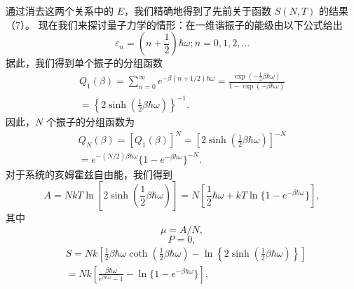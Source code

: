 通过消去这两个关系中的 \(E\)，我们精确地得到了先前关于函数 \(S(N,T)\) 的结果（7）。
现在我们来探讨量子力学的情形：在一维谐振子的能级由以下公式给出
\begin{equation}\tag{3.5.65}\label{eq:3.5.65}
\varepsilon _ { n } = \left( n + \frac { 1 } { 2 } \right) \hbar \omega ;  n = 0 , 1 , 2 , \ldots
\end{equation}
据此，我们得到单个振子的分组函数
\begin{equation}\tag{3.5.66}\label{eq:3.5.66}
\begin{array}{r} { Q _ { 1 } ( \beta ) = \displaystyle \sum _ { n = 0 } ^{\infty} e ^{- \beta ( n + 1 / 2 ) \hbar \omega} = \displaystyle \frac { \exp \left( - \frac { 1 } { 2 } \beta \hbar \omega \right) } { 1 - \exp ( - \beta \hbar \omega ) } } \\{ = \left\{ 2 \sinh \left( \frac { 1 } { 2 } \beta \hbar \omega \right) \right\} ^{- 1} . } \end{array}
\end{equation}
因此，\(N\) 个振子的分组函数为
\begin{equation}\tag{3.5.67}\label{eq:3.5.67}
\begin{array}{r} { Q _ { N } ( \beta ) = [ Q _ { 1 } ( \beta ) ] ^{N} = \left[ 2 \sinh \left( \frac { 1 } { 2 } \beta \hbar \omega \right) \right] ^{- N} } \\{ = e ^{- ( N / 2 ) \beta \hbar \omega} \{ 1 - e ^{- \beta \hbar \omega} \} ^{- N} . } \end{array}
\end{equation}
对于系统的亥姆霍兹自由能，我们得到
\begin{equation}\tag{3.5.68}\label{eq:3.5.68}
A = N k T \ln \left[ 2 \sinh \left( \frac { 1 } { 2 } \beta \hbar \omega \right) \right] = N \left[ \frac { 1 } { 2 } \hbar \omega + k T \ln \{ 1 - e ^{- \beta \hbar \omega} \} \right] ,
\end{equation}
其中
\begin{equation}\tag{3.5.69}\label{eq:3.5.69}
\mu = A / N ,
\end{equation}
\begin{equation}\tag{3.5.70}\label{eq:3.5.70}
P = 0 ,
\end{equation}
\begin{equation}\tag{3.5.71}\label{eq:3.5.71}
\begin{array}{rl} & { S = N k \left[ \frac { 1 } { 2 } \beta \hbar \omega \coth \left( \frac { 1 } { 2 } \beta \hbar \omega \right) - \ln \left\{ 2 \sinh \left( \frac { 1 } { 2 } \beta \hbar \omega \right) \right\} \right] } \\& { = N k \left[ \frac { \beta \hbar \omega } { e ^{\beta \hbar \omega} - 1 } - \ln \{ 1 - e ^{- \beta \hbar \omega} \} \right] , } \end{array}
\end{equation}
